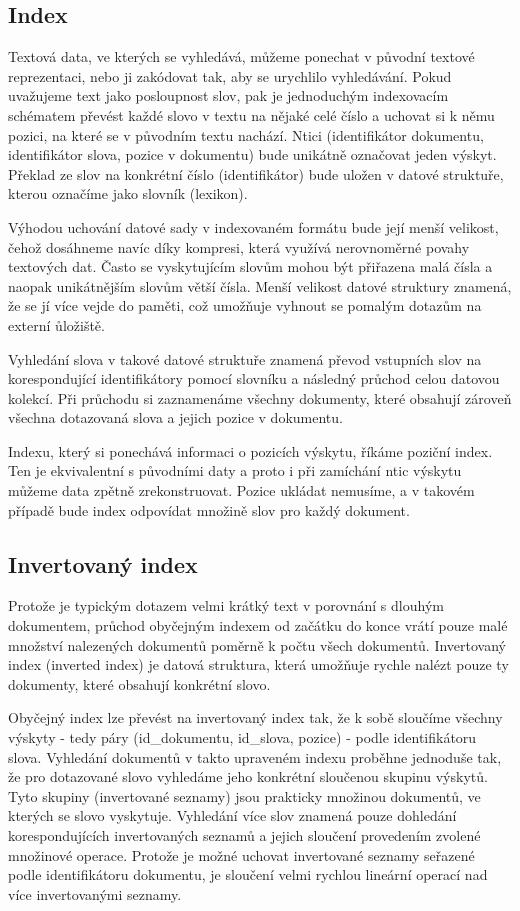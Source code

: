 \documentclass[11pt,letterpaper,oneside,openright]{book}
\begin{document}
\subsection{Index}
Textová data, ve kterých se vyhledává, můžeme ponechat v původní textové
reprezentaci, nebo ji zakódovat tak, aby se urychlilo vyhledávání. Pokud
uvažujeme text jako posloupnost slov, pak je jednoduchým indexovacím schématem
převést každé slovo v textu na nějaké celé číslo a uchovat si k němu pozici, na
které se v původním textu nachází. Ntici (identifikátor dokumentu,
identifikátor slova, pozice v dokumentu) bude unikátně označovat jeden výskyt.
Překlad ze slov na konkrétní číslo (identifikátor) bude uložen v datové
struktuře, kterou označíme jako slovník (lexikon).

Výhodou uchování datové sady v indexovaném formátu bude její menší velikost,
čehož dosáhneme navíc díky kompresi, která využívá nerovnoměrné povahy
textových dat. Často se vyskytujícím slovům mohou být přiřazena malá čísla a
naopak unikátnějším slovům větší čísla. Menší velikost datové struktury
znamená, že se jí více vejde do paměti, což umožňuje vyhnout se pomalým dotazům
na externí ůložiště.

Vyhledání slova v takové datové struktuře znamená převod vstupních slov na
korespondující identifikátory pomocí slovníku a následný průchod celou datovou
kolekcí. Při průchodu si zaznamenáme všechny dokumenty, které obsahují zároveň
všechna dotazovaná slova a jejich pozice v dokumentu.

Indexu, který si ponechává informaci o pozicích výskytu, říkáme poziční index.
Ten je ekvivalentní s původními daty a proto i při zamíchání ntic výskytu
můžeme data zpětně zrekonstruovat. Pozice ukládat nemusíme, a v takovém případě
bude index odpovídat množině slov pro každý dokument.


\subsection{Invertovaný index} \label{sec:inverted_index}
Protože je typickým dotazem velmi krátký text v porovnání s dlouhým dokumentem,
průchod obyčejným indexem od začátku do konce vrátí pouze malé množství
nalezených dokumentů poměrně k počtu všech dokumentů. Invertovaný index
(inverted index) je datová struktura, která umožňuje rychle nalézt pouze ty
dokumenty, které obsahují konkrétní slovo.

Obyčejný index lze převést na invertovaný index tak, že k sobě sloučíme všechny
výskyty - tedy páry (id\_dokumentu, id\_slova, pozice) - podle identifikátoru
slova. Vyhledání dokumentů v takto upraveném indexu proběhne jednoduše tak, že
pro dotazované slovo vyhledáme jeho konkrétní sloučenou skupinu výskytů. Tyto
skupiny (invertované seznamy) jsou prakticky množinou dokumentů, ve kterých se
slovo vyskytuje. Vyhledání více slov znamená pouze dohledání korespondujících
invertovaných seznamů a jejich sloučení provedením zvolené množinové operace.
Protože je možné uchovat invertované seznamy seřazené podle identifikátoru
dokumentu, je sloučení velmi rychlou lineární operací nad více invertovanými
seznamy.
\end{document}
